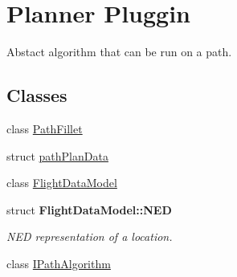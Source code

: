 \hypertarget{group___path}{\section{\-Planner \-Pluggin}
\label{group___path}
}


\-Abstact algorithm that can be run on a path.  


\subsection*{\-Classes}
\begin{DoxyCompactItemize}
\item 
class \hyperlink{class_path_fillet}{\-Path\-Fillet}
\item 
struct \hyperlink{structpath_plan_data}{path\-Plan\-Data}
\item 
class \hyperlink{class_flight_data_model}{\-Flight\-Data\-Model}
\item 
struct {\bfseries \-Flight\-Data\-Model\-::\-N\-E\-D}
\begin{DoxyCompactList}\small\item\em \-N\-E\-D representation of a location. \end{DoxyCompactList}\item 
class \hyperlink{class_i_path_algorithm}{\-I\-Path\-Algorithm}
\end{DoxyCompactItemize}
